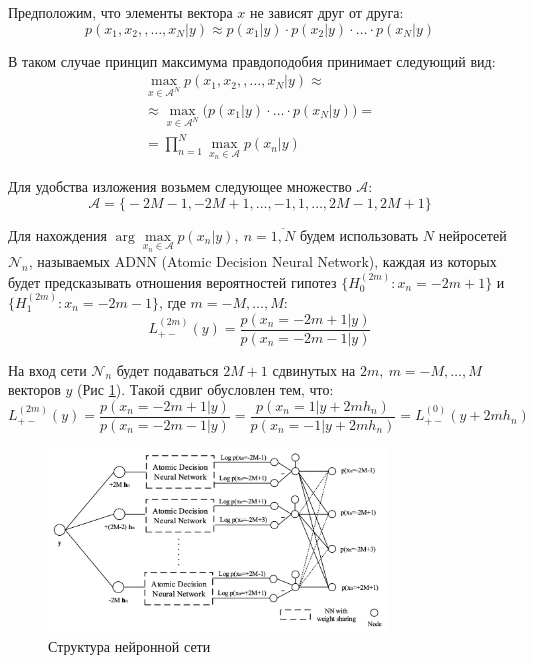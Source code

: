 \documentclass[12pt]{article}
\begin{document}
Предположим, что элементы вектора $x$ не зависят друг от друга:
    $$
    p(x_1, x_2, , \ldots, x_N | y) \approx p(x_1 | y) \cdot p(x_2 | y) \cdot \ldots \cdot p(x_N | y)
    $$

В таком случае принцип максимума правдоподобия принимает следующий вид:
    $$
    \begin{gathered}
    \max_{x \in \mathcal{A}^N} p(x_1, x_2, , \ldots, x_N | y) \approx \\
    \approx \max_{x \in \mathcal{A}^N} \big( p(x_1 | y) \cdot \ldots \cdot p(x_N | y) \big) = \\ 
    = \prod_{n=1}^N \max_{x_n \in \mathcal{A}} p(x_n | y)
    \end{gathered}
    $$

Для удобства изложения возьмем следующее множество $\mathcal{A}$:
    $$
    \mathcal{A} = \big\{ -2M - 1, -2M + 1, \dots, -1, 1, \dots, 2M - 1, 2M + 1 \big\}
    $$

Для нахождения $\arg \max\limits_{x_n \in \mathcal{A}} p(x_n | y), \ n = \overline{1, N}$ будем использовать $N$ нейросетей $\mathcal{N}_n$, называемых ADNN (Atomic Decision Neural Network), каждая из которых будет предсказывать отношения вероятностей гипотез $\{ H_0^{(2m)} : x_n = -2m + 1 \}$ и $\{ H_1^{(2m)} : x_n = -2m - 1 \}$, где $m = -M, \ldots, M$:
    $$
    L_{+-}^{(2m)}(y) = \frac{p(x_n = -2m + 1 | y)}{p(x_n = -2m - 1 | y)}
    $$

На вход сети $\mathcal{N}_n$ будет подаваться $2M+1$ сдвинутых на $2m, \ m = -M, \ldots, M$ векторов $y$ (Рис \ref{ADNN}). Такой сдвиг обусловлен тем, что:
    $$
    L_{+-}^{(2m)}(y) = \frac{p(x_n = -2m + 1 | y)}{p(x_n = -2m - 1 | y)} = \frac{p(x_n = 1 | y + 2m h_n)}{p(x_n = -1 | y + 2m h_n)}=  L_{+-}^{(0)}(y + 2m h_n)
    $$

\begin{figure}
    \centering
    \includegraphics[width=0.8\textwidth]{ADNN.png}
    \caption{Структура нейронной сети}
    \label{ADNN}
\end{figure}
\end{document}
